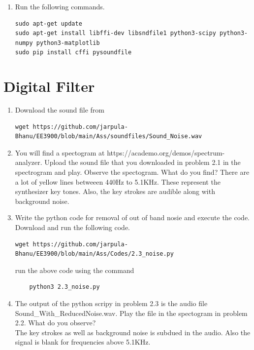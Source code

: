 \documentclass[journal,12pt,twocolumn]{IEEEtran}
\renewcommand\thesection{\arabic{section}}
\begin{document}
\begin{enumerate}[label=\thesection.\arabic*
,ref=\thesection.\theenumi]
\item Run the following commands.
\begin{lstlisting}
sudo apt-get update
sudo apt-get install libffi-dev libsndfile1 python3-scipy python3-numpy python3-matplotlib
sudo pip install cffi pysoundfile
\end{lstlisting}
\end{enumerate}

\section{Digital Filter}

\begin{enumerate}[label=\thesection.\arabic*
,ref=\thesection.\theenumi]
\item Download the sound file from
\begin{lstlisting}
wget https://github.com/jarpula-Bhanu/EE3900/blob/main/Ass/soundfiles/Sound_Noise.wav
\end{lstlisting}

\item You will find a spectogram at https://academo.org/demos/spectrum-analyzer. Upload the sound file that you downloaded in problem 2.1 in the spectrogram and play. Observe the spectogram. What do you find?
\solution There are a lot of yellow lines betweeen 440Hz to 5.1KHz. These represent the synthesizer key tones. Also, the key strokes are audible along with background noise.

\item Write the python code for removal of out of band nosie and execute the code.\label{2.3}\\
\solution Download and run the following code.
\begin{lstlisting}
wget https://github.com/jarpula-Bhanu/EE3900/blob/main/Ass/Codes/2.3_noise.py
\end{lstlisting}
run the above code using the command
\begin{lstlisting}
	python3 2.3_noise.py
\end{lstlisting}

\item The output of the python scripy in problem 2.3 is the audio file Sound\_With\_ReducedNoise.wav. Play the file in the spectogram in problem 2.2. What do you observe?\\
\solution The key strokes as well as background noise is subdued in the audio. Also the signal is blank for frequencies above 5.1KHz.
\end{enumerate}
\end{document}
